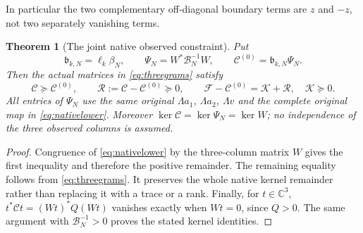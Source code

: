 \documentclass[11pt]{article}
\newtheorem{theorem}{Theorem}
\newcommand{\C}{\mathbb C}
\begin{document}
In particular the two complementary off-diagonal boundary terms are
$z$ and $-z$, not two separately vanishing terms.

\begin{theorem}[The joint native observed constraint]\label{thm:joint}
Put
\begin{equation}\label{eq:baseline}
 \mathfrak b_{k,N}=\ell_k\beta_N,\qquad
 \Psi_N=W^*\mathcal B_N^{-1}W,\qquad
 \mathcal C^{(0)}=\mathfrak b_{k,N}\Psi_N.
\end{equation}
Then the actual matrices in \eqref{eq:threegrams} satisfy
\begin{equation}\label{eq:joint}
 \boxed{\mathcal C\succeq\mathcal C^{(0)},\qquad
 \mathcal R:=\mathcal C-\mathcal C^{(0)}\succeq0,\qquad
 \mathcal F-\mathcal C^{(0)}=\mathcal K+\mathcal R,\quad
 \mathcal K\succeq0.}
\end{equation}
All entries of $\Psi_N$ use the same original $\Lambda a_1$,
$\Lambda a_2$, $\Lambda v$ and the complete original map in
\eqref{eq:nativelower}.
Moreover $\ker\mathcal C=\ker\Psi_N=\ker W$; no independence of
the three observed columns is assumed.
\end{theorem}
\begin{proof}
Congruence of \eqref{eq:nativelower} by the three-column matrix $W$
gives the first inequality and therefore the positive remainder.
The remaining equality follows from \eqref{eq:threegrams}.  It
preserves the whole native kernel remainder rather than replacing it
with a trace or a rank.
Finally, for $t\in\C^3$, $t^*\mathcal Ct=(Wt)^*Q(Wt)$ vanishes
exactly when $Wt=0$, since $Q>0$.  The same argument with
$\mathcal B_N^{-1}>0$ proves the stated kernel identities.
\end{proof}
\end{document}
